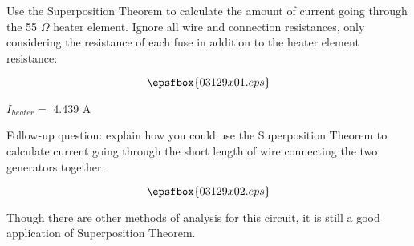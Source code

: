 

Use the Superposition Theorem to calculate the amount of current going through the 55 $\Omega$ heater element.  Ignore all wire and connection resistances, only considering the resistance of each fuse in addition to the heater element resistance:

$$\epsfbox{03129x01.eps}$$







$I_{heater} =$ 4.439 A

\vskip 10pt

Follow-up question: explain how you could use the Superposition Theorem to calculate current going through the short length of wire connecting the two generators together:

$$\epsfbox{03129x02.eps}$$







Though there are other methods of analysis for this circuit, it is still a good application of Superposition Theorem.




